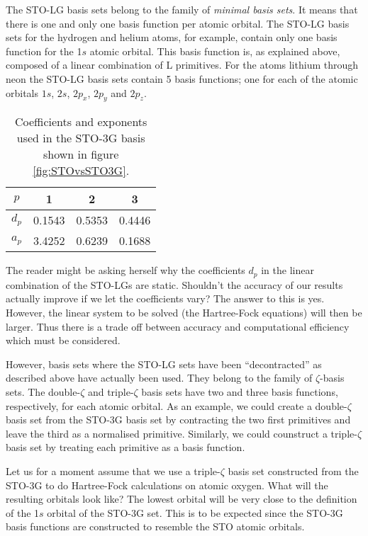 The STO-LG basis sets belong to the family of \emph{minimal basis sets}.
It means that there is one and only one basis function per atomic orbital.
The STO-LG basis sets for the hydrogen and helium atoms, for example, contain only one basis
function for the 1$s$ atomic orbital. This basis function is, as explained above, composed of
a linear combination of L primitives. For the atoms lithium through neon the STO-LG basis
sets contain 5 basis functions; one for each of the atomic orbitals
$1s$, $2s$, $2p_x$, $2p_y$ and $2p_z$.

\begin{table}
 \begin{center}
 \caption{Coefficients and exponents used in the STO-3G basis shown in figure \ref{fig:STOvsSTO3G}.}
 \label{tab:STO3G}
  \begin{tabular}{|c|c|c|c|}\hline
   $p$        &  1  &  2  &   3 \\ \hline
   $d_p$      &  0.1543   & 0.5353    & 0.4446  \\ \hline
   $a_p$ &  3.4252   & 0.6239    & 0.1688  \\ \hline
  \end{tabular}
 \end{center}
\end{table}

The reader might be asking herself why the coefficients $d_p$ in the linear combination of the STO-LGs are static. Shouldn't the accuracy of our results
actually improve if we let the coefficients vary? The answer to this is yes. However, the linear system to be solved (the Hartree-Fock equations) will then
be larger. Thus there is a trade off between accuracy and computational efficiency which must be considered.

However, basis sets where the STO-LG sets have been ``decontracted'' as described above have actually been used. They belong to the family of $\zeta$-basis sets.
The double-$\zeta$ and triple-$\zeta$ basis sets have two and three basis functions, respectively, for each atomic orbital. As an example, we could
create a double-$\zeta$ basis set from the STO-3G basis set by contracting the two first primitives and leave the third as a normalised primitive. Similarly, we could
counstruct a triple-$\zeta$ basis set by treating each primitive as a basis function.

Let us for a moment assume that we use a triple-$\zeta$ basis set constructed from the STO-3G to do Hartree-Fock calculations on atomic oxygen.
What will the resulting orbitals look like? The lowest orbital will be very close to the definition of the 1$s$ orbital of the STO-3G set.
This is to be expected since the STO-3G basis functions are constructed to resemble the STO atomic orbitals.

